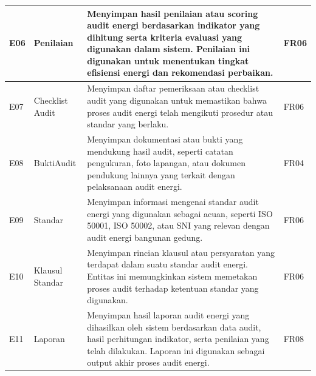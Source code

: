 \begin{tabularx}{\textwidth}{
  >{\raggedright\arraybackslash}p{1cm} 
  >{\raggedright\arraybackslash}p{2cm} 
  X 
  >{\raggedright\arraybackslash}p{1cm}
}
    E06 & Penilaian &
    Menyimpan hasil penilaian atau scoring audit energi berdasarkan indikator yang dihitung serta kriteria evaluasi yang digunakan dalam sistem. Penilaian ini digunakan untuk menentukan tingkat efisiensi energi dan rekomendasi perbaikan. &
    FR06 \\
    \hline

    E07 & Checklist Audit &
    Menyimpan daftar pemeriksaan atau checklist audit yang digunakan untuk memastikan bahwa proses audit energi telah mengikuti prosedur atau standar yang berlaku. &
    FR06 \\
    \hline

    E08 & BuktiAudit &
    Menyimpan dokumentasi atau bukti yang mendukung hasil audit, seperti catatan pengukuran, foto lapangan, atau dokumen pendukung lainnya yang terkait dengan pelaksanaan audit energi. &
    FR04 \\
    \hline

    E09 & Standar &
    Menyimpan informasi mengenai standar audit energi yang digunakan sebagai acuan, seperti ISO 50001, ISO 50002, atau SNI yang relevan dengan audit energi bangunan gedung. &
    FR06 \\
    \hline

    E10 & Klausul Standar &
    Menyimpan rincian klausul atau persyaratan yang terdapat dalam suatu standar audit energi. Entitas ini memungkinkan sistem memetakan proses audit terhadap ketentuan standar yang digunakan. &
    FR06 \\
    \hline

    E11 & Laporan &
    Menyimpan hasil laporan audit energi yang dihasilkan oleh sistem berdasarkan data audit, hasil perhitungan indikator, serta penilaian yang telah dilakukan. Laporan ini digunakan sebagai output akhir proses audit energi. &
    FR08 \\
    \hline
\end{tabularx}